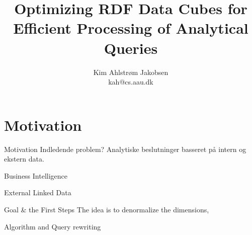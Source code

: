 

\title[Optimizing RDF Data Cubes]{Optimizing RDF Data Cubes for Efficient Processing of Analytical Queries}
\author[Kim Ahlstr\o{}m Jakobsen]{\large Kim Ahlstr\o{}m Jakobsen \\ kah@cs.aau.dk}
\date[October 12th, 2015]{}



\newcommand{\kimauthor}{\author{Kim Ahlstr\o{}m Jakobsen}}
\begin{frame}
\titlepage
\end{frame}






\newcommand{\intro}{Motivation}
\section{\intro}
\begin{frame}{\intro}
Indledende problem? 
Analytiske beslutninger basseret på intern og ekstern data.


\end{frame}

\begin{frame}{Business Intelligence}

\end{frame}

\begin{frame}{External Linked Data}

\end{frame}

\begin{frame}{Goal \& the First Steps}
The idea is to denormalize the dimensions, 

Algorithm and Query rewriting
\end{frame}

